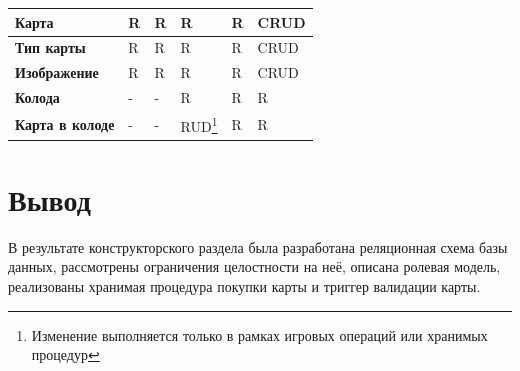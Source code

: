\begin{longtable}{|p{}|p{}|p{}|p{}|p{}|p{}|}
	\textbf{Карта}                                                      & R
	                                                                    & R
	                                                                    & R
	                                                                    & R
	                                                                    &
	CRUD
	\\ \hline

	\textbf{Тип карты}                                                  & R
	                                                                    & R
	                                                                    & R
	                                                                    & R
	                                                                    &
	CRUD
	\\ \hline

	\textbf{Изображение}                                                & R
	                                                                    & R
	                                                                    & R
	                                                                    & R
	                                                                    &
	CRUD
	\\ \hline

	\textbf{Колода}                                                     & -
	                                                                    & -
	                                                                    & R
	                                                                    & R
	                                                                    & R
	\\ \hline

	\textbf{Карта в колоде}                                             & -
	                                                                    & -
	                                                                    &
	RUD\footnote{\label{gameproc} Изменение
	выполняется только в рамках игровых операций или хранимых процедур} & R
	                                                                    & R

	\\
	\hline
\end{longtable}

\section*{Вывод}
В результате конструкторского раздела была разработана реляционная схема базы
данных, рассмотрены ограничения целостности на неё, описана ролевая модель,
реализованы хранимая процедура покупки карты и триггер валидации карты.